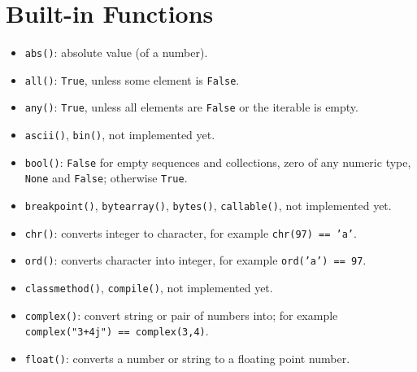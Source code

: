 \section{Built-in Functions}
\begin{itemize}

\item \texttt{abs()}: absolute value (of a number).

\item \texttt{all()}: \texttt{True}, unless some element is \texttt{False}.

\item \texttt{any()}: \texttt{True}, unless all elements are \texttt{False} or the iterable is empty.

\item
\texttt{ascii()},
\texttt{bin()},
\dotfill not implemented yet.

\item \texttt{bool()}: \texttt{False} for empty sequences and collections, zero of any numeric type, \texttt{None} and \texttt{False}; otherwise \texttt{True}.

\item
\texttt{breakpoint()},
\texttt{bytearray()},
\texttt{bytes()},
\texttt{callable()},
\dotfill not implemented yet.

\item \texttt{chr()}: converts integer to character, for example \texttt{chr(97) == 'a'}.

\item \texttt{ord()}: converts character into integer, for example \texttt{ord('a') == 97}.

\item
\texttt{classmethod()},
\texttt{compile()},
\dotfill not implemented yet.

\item \texttt{complex()}: convert string or pair of numbers into; for example \texttt{complex("3+4j") == complex(3,4)}.

\item \texttt{float()}: converts a number or string to a floating point number.


\end{itemize}
